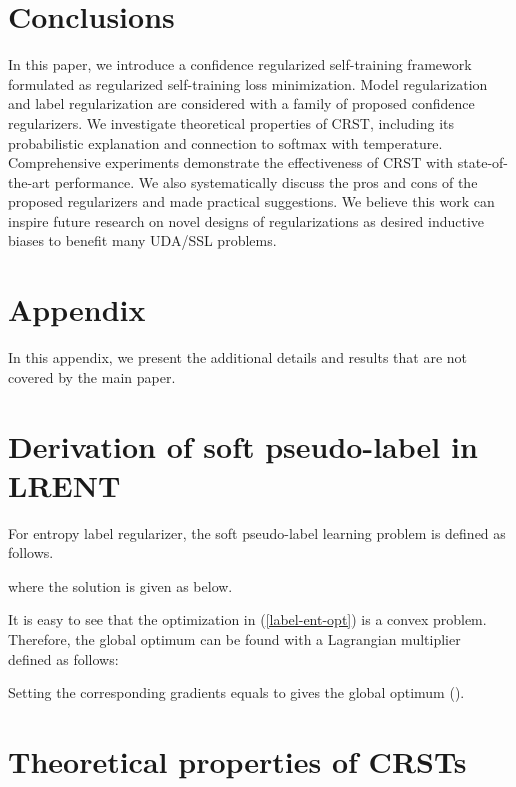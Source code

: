 \documentclass[10pt,twocolumn,letterpaper]{article}
\theoremstyle{plain}
\begin{document}
\section{Conclusions}\label{sec:conclusion}
In this paper, we introduce a confidence regularized self-training framework formulated as regularized self-training loss minimization. Model regularization and label regularization are considered with a family of proposed confidence regularizers. We investigate theoretical properties of CRST, including its probabilistic explanation and connection to softmax with temperature. Comprehensive experiments demonstrate the effectiveness of CRST with state-of-the-art performance. We also systematically discuss the pros and cons of the proposed regularizers and made practical suggestions. We believe this work can inspire future research on novel designs of regularizations as desired inductive biases to benefit many UDA/SSL problems.

{\small


}

\clearpage

\section*{Appendix}
In this appendix, we present the additional details and results that are not covered by the main paper.

\setcounter{section}{0}
\renewcommand{\thesection}{\Alph{section}}

\section{Derivation of soft pseudo-label in LRENT}\label{sec:derivlrent}
For entropy label regularizer, the soft pseudo-label learning problem is defined as follows.

where the solution is given as below.


It is easy to see that the optimization in (\ref{label-ent-opt}) is a convex problem. Therefore, the global optimum can be found with a Lagrangian multiplier~\cite{boyd2004convex} defined as follows:

Setting the corresponding gradients equals to  gives the global optimum ().


\section{Theoretical properties of CRSTs}
\end{document}
